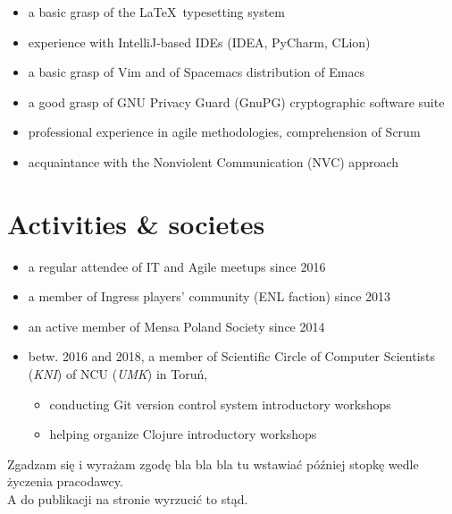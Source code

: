 \documentclass[a4paper]{res}
\begin{document}
\begin{resume}
\begin{itemize}
        \vspace{-0.04in}
        \item a basic grasp of the \LaTeX~typesetting system
        \vspace{-0.04in}
        \item experience with IntelliJ-based IDEs (IDEA, PyCharm, CLion)
        \vspace{-0.04in}
        \item a basic grasp of Vim and of Spacemacs distribution of Emacs
        \vspace{-0.04in}
        \item a good grasp of GNU Privacy Guard (GnuPG) cryptographic software suite
        \item professional experience in agile methodologies, comprehension of Scrum
        \vspace{-0.04in}
        \item acquaintance with the Nonviolent Communication (NVC) approach
    \end{itemize}
    \vspace{-0.24in}
    \section{Activities \& societes}
        \vspace{0.1in}
    \begin{itemize}
        \item a regular attendee of IT and Agile meetups since 2016
        \vspace{-0.07in}
        \item a member of Ingress players' community (ENL faction) since 2013
        \vspace{-0.07in}
        \item an active member of Mensa Poland Society since 2014
        \vspace{-0.05in}
        \item \footnotesize betw. 2016 and 2018, a member of {Scientific Circle of Computer Scientists (\textsl{KNI})
        of NCU (\textsl{UMK}) in Toruń},
        \vspace{-0.2in}
        \begin{itemize}
        \vspace{-0.01in}
            \item conducting Git version control system introductory workshops
        \vspace{-0.05in}
            \item helping organize Clojure introductory workshops
        \end{itemize}
    \end{itemize}
\end{resume}
\vspace{-0.35in}
\begin{center}
    \noindent\makebox[\dimexpr\linewidth]{\rule{\dimexpr\paperwidth-3in}{0.4pt}}
    \footnotesize
    Zgadzam się i wyrażam zgodę bla bla bla tu wstawiać później stopkę wedle życzenia pracodawcy.\\
    A do publikacji na stronie wyrzucić to stąd.
\end{center}
\end{document}
